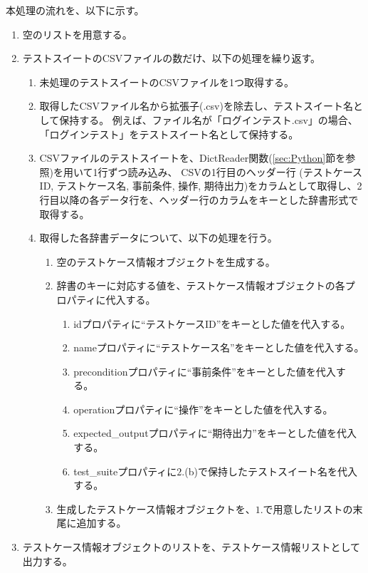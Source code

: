 本処理の流れを、以下に示す。
\begin{enumerate}
    \item 空のリストを用意する。
    \item テストスイートのCSVファイルの数だけ、以下の処理を繰り返す。
    \begin{enumerate}
        \item 未処理のテストスイートのCSVファイルを1つ取得する。
        \item 取得したCSVファイル名から拡張子(.csv)を除去し、テストスイート名として保持する。
        例えば、ファイル名が「ログインテスト.csv」の場合、「ログインテスト」をテストスイート名として保持する。
        \item CSVファイルのテストスイートを、DictReader関数(\ref{sec:Python}節を参照)を用いて1行ずつ読み込み、
        CSVの1行目のヘッダー行 (テストケースID, テストケース名, 事前条件, 操作, 期待出力)をカラムとして取得し、2行目以降の各データ行を、ヘッダー行のカラムをキーとした辞書形式で取得する。
        \item 取得した各辞書データについて、以下の処理を行う。
        \begin{enumerate}
            \item 空のテストケース情報オブジェクトを生成する。
            \item 辞書のキーに対応する値を、テストケース情報オブジェクトの各プロパティに代入する。
            \begin{enumerate}
                \item idプロパティに``テストケースID''をキーとした値を代入する。
                \item nameプロパティに``テストケース名''をキーとした値を代入する。
                \item preconditionプロパティに``事前条件''をキーとした値を代入する。
                \item operationプロパティに``操作''をキーとした値を代入する。
                \item expected\_outputプロパティに``期待出力''をキーとした値を代入する。
                \item test\_suiteプロパティに$2$.(b)で保持したテストスイート名を代入する。
            \end{enumerate}
            \item 生成したテストケース情報オブジェクトを、$1$.で用意したリストの末尾に追加する。
        \end{enumerate}
    \end{enumerate}
    \item テストケース情報オブジェクトのリストを、テストケース情報リストとして出力する。
\end{enumerate}

